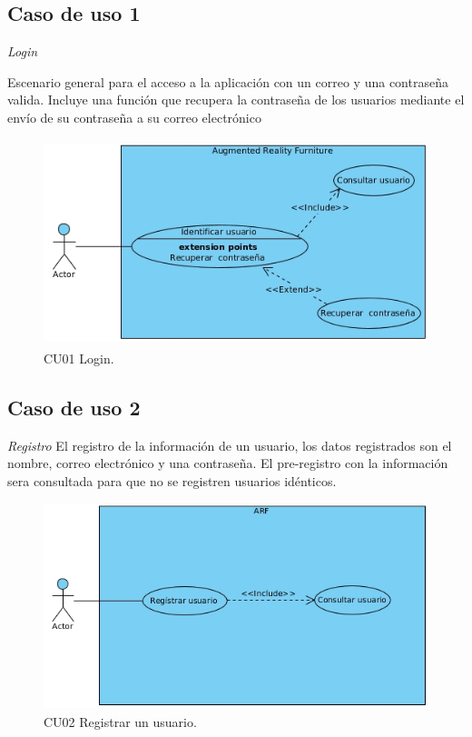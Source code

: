 \subsection{Caso de uso 1} \textit{Login}\par
Escenario general para el acceso a la aplicación con un correo y una contraseña valida. Incluye una función que recupera la contraseña de los usuarios mediante el envío de su contraseña a su correo electrónico
\begin{figure}[h!]
	\centering
	\includegraphics[width=12cm,height=6cm]{imagenes/analisis/login.jpg}
	\caption{CU01 Login.}
	
	\label{fig:analogo}
\end{figure}  
\subsection{Caso de uso 2} \textit{Registro} 
	El registro de la información de un usuario, los datos registrados son el nombre, correo electrónico y una contraseña. El pre-registro con la información sera consultada para que no se registren usuarios idénticos.
\vspace{5mm} 	
\begin{figure}[h!]
	\centering
	\includegraphics[width=12cm,height=6cm]{imagenes/analisis/registrarUsuario.jpg}
	\caption{CU02 Registrar un usuario.}
	\label{fig:analogo}
\end{figure} 
\newpage
